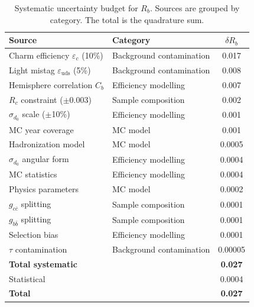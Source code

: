 \documentclass[11pt,a4paper]{article}
\begin{document}
\begin{table}[htbp]
\centering
\caption{Systematic uncertainty budget for $R_b$.  Sources are grouped
  by category.  The total is the quadrature sum.}
\label{tbl:syst-rb}
\begin{tabular}{llc}
\toprule
Source & Category & $\delta R_b$ \\
\midrule
Charm efficiency $\varepsilon_c$ (10\%) & Background contamination & 0.017 \\
Light mistag $\varepsilon_\mathrm{uds}$ (5\%) & Background contamination & 0.008 \\
Hemisphere correlation $C_b$ & Efficiency modelling & 0.007 \\
$R_c$ constraint ($\pm 0.003$) & Sample composition & 0.002 \\
$\sigma_{d_0}$ scale ($\pm$10\%) & Efficiency modelling & 0.001 \\
MC year coverage & MC model & 0.001 \\
Hadronization model & MC model & 0.0005 \\
$\sigma_{d_0}$ angular form & Efficiency modelling & 0.0004 \\
MC statistics & Efficiency modelling & 0.0004 \\
Physics parameters & MC model & 0.0002 \\
$g_{c\bar{c}}$ splitting & Sample composition & 0.0001 \\
$g_{b\bar{b}}$ splitting & Sample composition & 0.0001 \\
Selection bias & Efficiency modelling & 0.0001 \\
$\tau$ contamination & Background contamination & 0.00005 \\
\midrule
\textbf{Total systematic} & & \textbf{0.027} \\
Statistical & & 0.0004 \\
\midrule
\textbf{Total} & & \textbf{0.027} \\
\bottomrule
\end{tabular}
\end{table}
\end{document}
